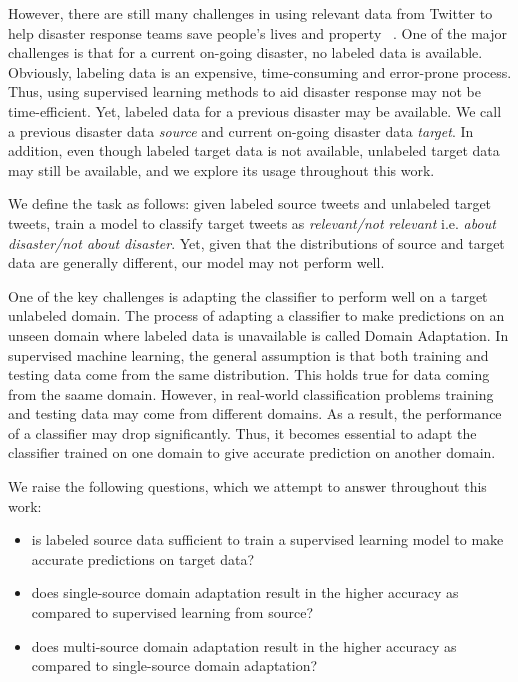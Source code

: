However, there are still many challenges in using relevant data from Twitter to help disaster response teams save people’s lives and property ~\citep{mendoza}. One of the major challenges is that for a current on-going disaster, no labeled data is available. Obviously, labeling data is an expensive, time-consuming and error-prone process. Thus, using supervised learning methods to aid disaster response may not be time-efficient. Yet, labeled data for a previous disaster may be available. We call a previous disaster data \textit{source} and current on-going disaster data \textit{target}. In addition, even though labeled target data is not available, unlabeled target data may still be available, and we explore its usage throughout this work.

We define the task as follows: given labeled source tweets and unlabeled target tweets, train a model to classify target tweets as \textit{relevant/not relevant} i.e. \textit{about disaster/not about disaster}. Yet, given that the distributions of source and target data are generally different, our model may not perform well. 

One of the key challenges is adapting the classifier to perform well on a target unlabeled domain. The process of adapting a classifier to make predictions on an unseen domain where labeled data is unavailable is called Domain Adaptation. In supervised machine learning, the general assumption is that both training and testing data come from the same distribution. This holds true for data coming from the saame domain. However, in real-world classification problems training and testing data may come from different domains. As a result, the performance of a classifier may drop significantly. Thus, it becomes essential to adapt the classifier trained on one domain to give accurate prediction on another domain. 

We raise the following questions, which we attempt to answer throughout this work:

\begin{itemize}
  \item is labeled source data sufficient to train a supervised learning model to make accurate predictions on target data?
  \item does single-source domain adaptation result in the higher accuracy as compared to supervised learning from source?
  \item does multi-source domain adaptation result in the higher accuracy as compared to single-source domain adaptation?
\end{itemize}

